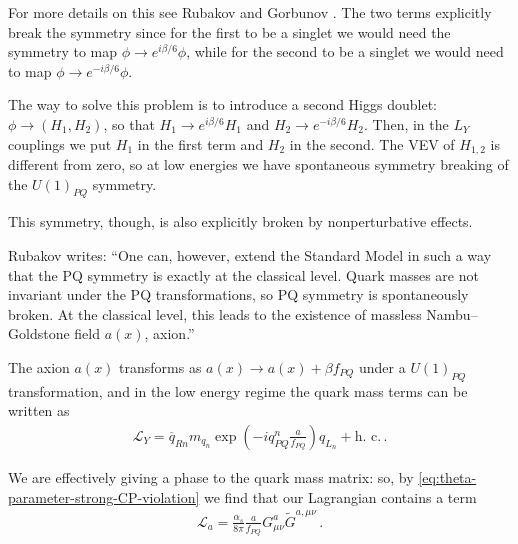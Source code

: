 \documentclass[main.tex]{subfiles}
\begin{document}
For more details on this see Rubakov and Gorbunov \cite[eq.\ B.8 onwards]{gorbunovIntroductionTheoryEarly2011}.
The two terms explicitly break the symmetry since for the first to be a singlet we would need the symmetry to map \(\phi \to e^{i \beta /6} \phi \), while for the second to be a singlet we would need to map \(\phi \to e^{-i \beta /6} \phi \).





The way to solve this problem is to introduce a second Higgs doublet: \(\phi \to (H_1 , H_2 )\), so that \(H_1 \to e^{i \beta /6} H_1 \) and \(H_2 \to e^{- i \beta /6} H_2 \).
Then, in the \(L_Y\) couplings we put \(H_1 \) in the first term and \(H_2 \) in the second. 
The VEV of \(H_{1,2}\) is different from zero, so at low energies we have spontaneous symmetry breaking of the \(U(1)_{PQ}\) symmetry.

This symmetry, though, is also explicitly broken by nonperturbative effects. 

Rubakov writes:
``One can, however, extend the Standard Model in such a way that the PQ symmetry is
exactly at the classical level. Quark masses are not invariant under the PQ transformations, so PQ symmetry is spontaneously broken. At the classical level, this leads to the
existence of massless Nambu–Goldstone field \(a(x)\), axion.''

The axion \(a(x)\) transforms as \(a(x) \to a(x) + \beta f_{PQ}\) under a \(U(1)_{PQ}\) transformation, and in the low energy regime the quark mass terms can be written as 
%
\begin{align}
\mathscr{L}_{Y} = \overline{q}_{Rn} m_{q_n}
\exp(-i q^{n}_{PQ}  \frac{a}{f_{PQ}})
q_{L_n}
+ \text{h.\ c.}
\,.
\end{align}

We are effectively giving a phase to the quark mass matrix: so, by \eqref{eq:theta-parameter-strong-CP-violation} we find that our Lagrangian contains a term 
%
\begin{align}
\mathscr{L}_{a} = \frac{\alpha_{s}}{8 \pi } \frac{a}{f_{PQ}} G^{a}_{\mu \nu } 
\widetilde{G}^{a, \mu \nu }
\,.
\end{align}
\end{document}
